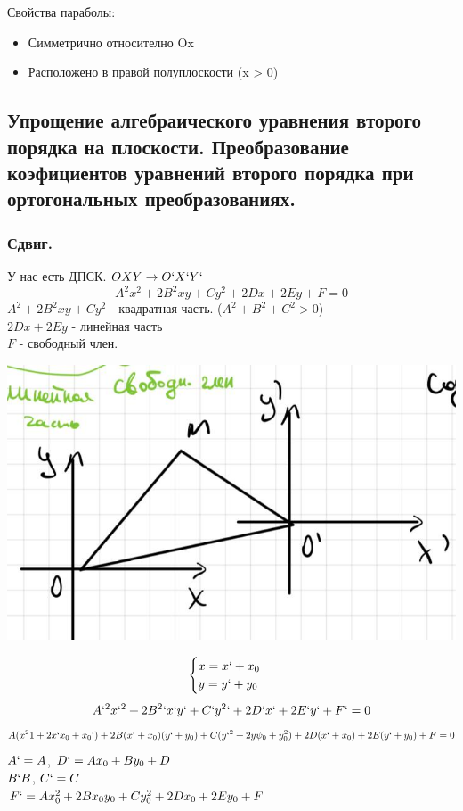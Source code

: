 \documentclass[12pt, paper]{article}
\begin{document}
Свойства параболы:
\begin{itemize}
	\item Симметрично относително Ox
	\item Расположено в правой полуплоскости (x > 0)
\end{itemize}

\subsection{Упрощение алгебраического уравнения второго порядка на плоскости. Преобразование коэфициентов уравнений второго порядка при ортогональных преобразованиях.}
\setcounter{equatoin}{0}
\subsubsection{Сдвиг.}
У нас есть ДПСК. $OXY \to O`X`Y`$\\
\[ A^2x^2 + 2B^2xy + Cy^2 + 2Dx + 2Ey + F = 0 \]
$A^2 + 2B^2xy + Cy^2$ - квадратная часть. ($A^2 + B^2 + C^2 > 0$)\\
$ 2Dx + 2Ey $ - линейная часть\\
$F$ - свободный член.

\begin{center}
	\includegraphics[width=0.5\linewidth]{images/Прямые 2 порядка/Преобразования алг коэф/Переход.jpg}\\
\end{center}


\[ 
	\begin{cases}
		x = x` + x_0\\
		y = y` + y_0\\
	\end{cases}
\]
\[ A`^2x`^2 + 2B^2`x`y` + C`y^2` + 2D`x` + 2E`y` + F` = 0 \]
\[ A(x^21 + 2x`x_0 + x_0` )  + 2B(x` + x_0) (y` + y_0) + C(y`^2 + 2y\psi_0 + y_0^2) + 2D(x`+ x_0) + 2E(y` + y_0) + F = 0 \]
$A` = A$, $D` = Ax_0 + By_0 + D$\\
$B`  B$, $C` = C$\\
$ F` = Ax_0^2 + 2Bx_0y_0 + Cy_0^2 + 2Dx_0 + 2Ey_0 + F $
\end{document}
